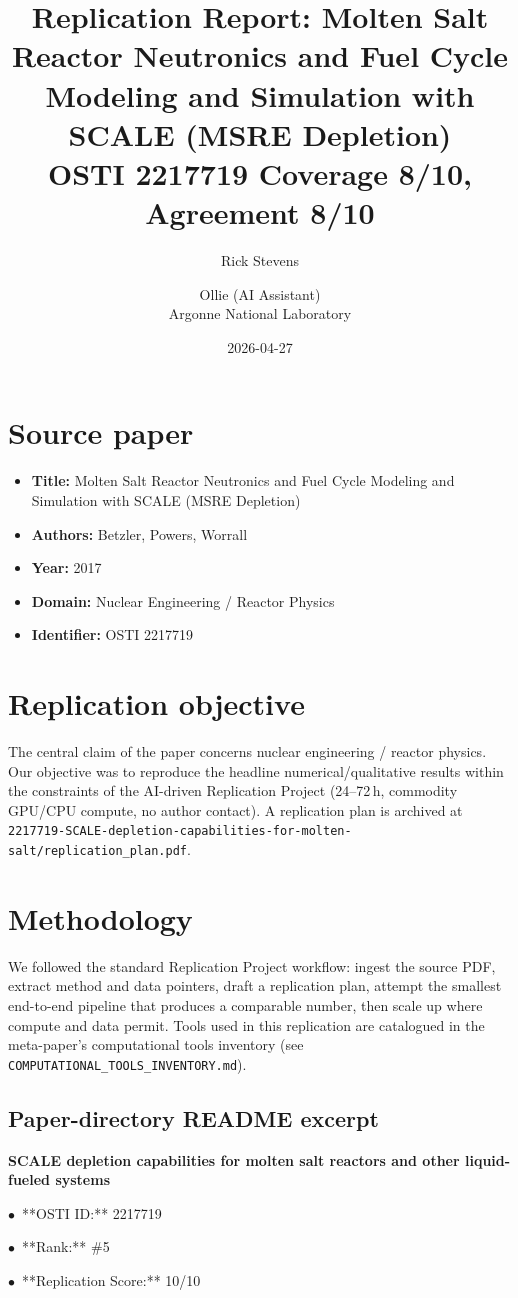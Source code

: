 \documentclass[11pt]{article}
\title{Replication Report: Molten Salt Reactor Neutronics and Fuel Cycle Modeling and Simulation with SCALE (MSRE Depletion)\\[2pt]\large OSTI 2217719 \textbar{} Coverage 8/10, Agreement 8/10}
\author{Rick Stevens \and Ollie (AI Assistant)\\\small Argonne National Laboratory}
\date{2026-04-27}
\begin{document}
\maketitle

\section{Source paper}
\begin{itemize}
\item \textbf{Title:} Molten Salt Reactor Neutronics and Fuel Cycle Modeling and Simulation with SCALE (MSRE Depletion)
\item \textbf{Authors:} Betzler, Powers, Worrall
\item \textbf{Year:} 2017
\item \textbf{Domain:} Nuclear Engineering / Reactor Physics
\item \textbf{Identifier:} OSTI 2217719
\end{itemize}


\section{Replication objective}
The central claim of the paper concerns nuclear engineering / reactor physics. Our objective was to reproduce the headline numerical/qualitative results within the constraints of the AI-driven Replication Project (24--72\,h, commodity GPU/CPU compute, no author contact). A replication plan is archived at \texttt{2217719-SCALE-depletion-capabilities-for-molten-salt/replication\_plan.pdf}.

\section{Methodology}
We followed the standard Replication Project workflow: ingest the source PDF, extract method and data pointers, draft a replication plan, attempt the smallest end-to-end pipeline that produces a comparable number, then scale up where compute and data permit. Tools used in this replication are catalogued in the meta-paper's computational tools inventory (see \texttt{COMPUTATIONAL\_TOOLS\_INVENTORY.md}).



\subsection*{Paper-directory README excerpt}
\small
\par\medskip\textbf{SCALE depletion capabilities for molten salt reactors and other liquid-fueled systems}\par
\par$\bullet$\ **OSTI ID:** 2217719
\par$\bullet$\ **Rank:** \#5
\par$\bullet$\ **Replication Score:** 10/10
\end{document}
